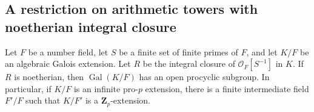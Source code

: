 \subsection{A restriction on arithmetic towers with noetherian integral closure}

\begin{proposition}
\label{A:A2-Galois-tower-procyclic}
Let $F$ be a number field, let $S$ be a finite set of finite primes
of $F$, and let $K/F$ be an algebraic Galois extension.  Let $R$ be
the integral closure of $\mathcal O_F[S^{-1}]$ in $K$.  If $R$ is
noetherian, then $\operatorname{Gal}(K/F)$ has an open procyclic
subgroup.  In particular, if $K/F$ is an infinite pro-$p$ extension,
there is a finite intermediate field $F'/F$ such that $K/F'$ is a
$\mathbf Z_p$-extension.
\end{proposition}


